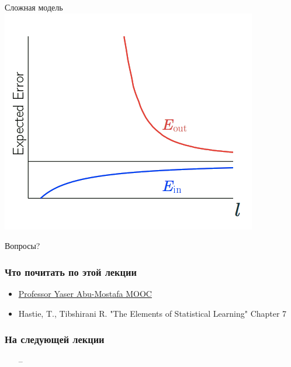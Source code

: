 \documentclass[10pt]{beamer}
\begin{document}
\begin{frame}{Сложная модель}
  \centering
  \includegraphics[width=0.8 \textwidth, keepaspectratio]{images/complex_model}
\end{frame}

\begin{frame}[standout]
  Вопросы?
\end{frame}

\appendix

\begin{frame}\frametitle{Что почитать по этой лекции}
  \begin{itemize}
    \item \href{http://work.caltech.edu/telecourse.html}{Professor Yaser Abu-Mostafa MOOC}
    \item  Hastie, T., Tibshirani R. "The Elements of Statistical Learning" Chapter 7 
  \end{itemize}
\end{frame}

\begin{frame}\frametitle{На следующей лекции}
	\begin{itemize}
    	\item[--]  	    	
	\end{itemize}
\end{frame}
\end{document}
